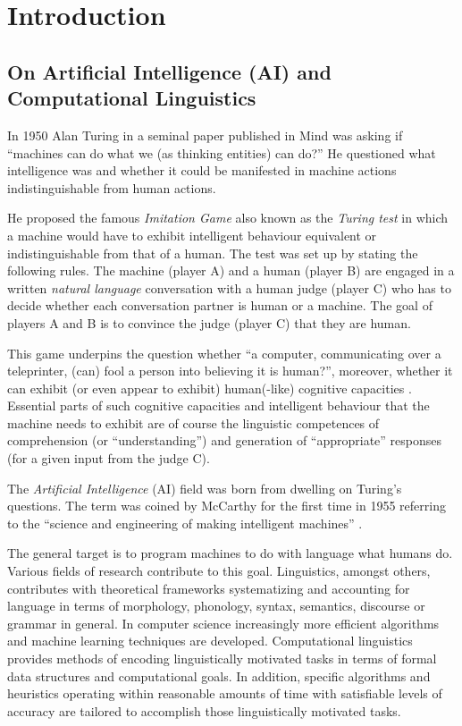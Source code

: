\chapter{Introduction}

\section{On Artificial Intelligence (AI) and Computational Linguistics}
In 1950 Alan Turing in a seminal paper \citep{Turing1950} published in Mind was asking if ``machines can do what we (as thinking entities) can do?'' He questioned what intelligence was and whether it could be manifested in machine actions indistinguishable from human actions. 

He proposed the famous \textit{Imitation Game} also known as the \textit{Turing test} in which a machine would have to exhibit intelligent behaviour equivalent or indistinguishable from that of a human. The test was set up by stating the following rules. The machine (player A) and a human (player B) are engaged in a written \textit{natural language} conversation with a human judge (player C) who has to decide whether each conversation partner is human or a machine. The goal of players A and B is to convince the judge (player C) that they are human. 

This game underpins the question whether ``a computer, communicating over a teleprinter, (can) fool a person into believing it is human?'', moreover, whether it can exhibit (or even appear to exhibit) human(-like) cognitive capacities \citep{Harnad1992}. Essential parts of such cognitive capacities and intelligent behaviour that the machine needs to exhibit are of course the linguistic competences of comprehension (or ``understanding'') and generation of ``appropriate'' responses (for a given input from the judge C).

The \textit{Artificial Intelligence} (AI) field was born from dwelling on Turing's questions. The term was coined by McCarthy for the first time in 1955 referring to the ``science and engineering of making intelligent machines'' \citep{McCarthy1955}.

The general target is to program machines to do with language what humans do. Various fields of research contribute to this goal. Linguistics, amongst others, contributes with theoretical frameworks systematizing and accounting for language in terms of morphology, phonology, syntax, semantics, discourse or grammar in general. In computer science increasingly more efficient algorithms and machine learning techniques are developed. Computational linguistics provides methods of encoding linguistically motivated tasks in terms of formal data structures and computational goals. In addition, specific algorithms and heuristics operating within reasonable amounts of time with satisfiable levels of accuracy are tailored to accomplish those linguistically motivated tasks.

